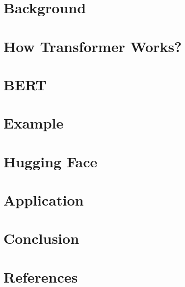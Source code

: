 \section[Back]{Background}




\section[How]{How Transformer Works?}



\section[BERT]{BERT}


\section[Ex]{Example}


\section[HF]{Hugging Face}


\section[Appln]{Application}


\section[Cncl]{Conclusion}


\section[Refs]{References}
